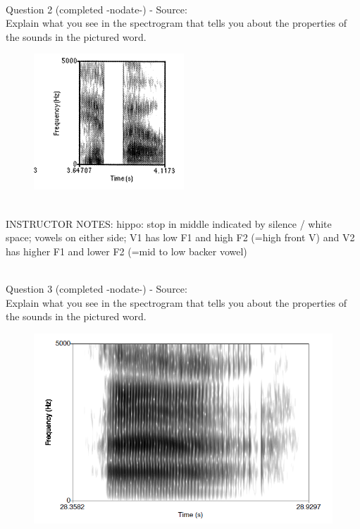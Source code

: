 \documentclass[12pt]{article}
\begin{document}
~\\

{\large Question 2} (completed -nodate-) - Source: \\

Explain what you see in the spectrogram that tells you about the properties of the sounds in the pictured word.\\

\begin{figure}[H]
\includegraphics{../images/spectrogram_hippo.png}
\end{figure}

~\\
INSTRUCTOR NOTES: hippo: stop in middle indicated by silence / white space; vowels on either side; V1 has low F1 and high F2 (=high front V) and V2 has higher F1 and lower F2 (=mid to low backer vowel)


~\\

{\large Question 3} (completed -nodate-) - Source: \\

Explain what you see in the spectrogram that tells you about the properties of the sounds in the pictured word.\\

\begin{figure}[H]
\includegraphics{../images/spectrogram_aaah.png}
\end{figure}
\end{document}
